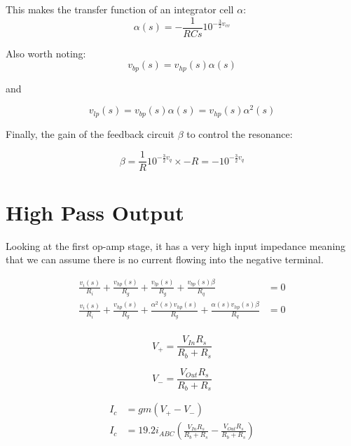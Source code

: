 \documentclass{article}
\begin{document}
This makes the transfer function of an integrator cell $\alpha$:
\begin{equation}
  \alpha(s) = - \frac{1}{RCs}10^{-{\frac{3}{2}}v_{cv}}
\end{equation}

Also worth noting:
\begin{equation}
  v_{bp} (s) = v_{hp} (s)\alpha(s)
\end{equation}

and

\begin{equation}
  v_{lp} (s) = v_{bp} (s)\alpha(s) = v_{hp}(s)\alpha^2(s)
\end{equation}

Finally, the gain of the feedback circuit $\beta$ to control the resonance:

\begin{equation}
  \beta = \frac{1}{R}10^{-{\frac{3}{2}}v_{q}} \times -R = -10^{-{\frac{3}{2}}v_{q}}
\end{equation}

\section{High Pass Output}

Looking at the first op-amp stage, it has a very high input impedance meaning that we can assume there is no current flowing into the negative terminal.

\begin{equation*}
\begin{split}
  \frac{v_i(s)}{R_i} + \frac{v_{hp}(s)}{R_g} + \frac{v_{lp}(s)}{R_g} + \frac{v_{bp}(s)\beta}{R_q} & = 0 \\
  \frac{v_i(s)}{R_i} + \frac{v_{hp}(s)}{R_g} + \frac{{\alpha}^2(s)v_{hp}(s)}{R_g} + \frac{{\alpha}(s)v_{hp}(s)\beta}{R_q} & = 0 \\
\end{split}
\end{equation*}


\begin{equation}
  V_{+} = \frac{V_{In}R_{s}}{R_{b} + R_{s}}
\end{equation}

\begin{equation}
  V_{-} = \frac{V_{Out}R_{s}}{R_{b} + R_{s}}
\end{equation}

\begin{equation*}
\begin{split}
  I_{c} & = {gm}(V_{+} - V_{-}) \\
  I_{c} & = {19.2}i_{ABC}(\frac{V_{In}R_{s}}{R_{b} + R_{s}} - \frac{V_{Out}R_{s}}{R_{b} + R_{s}}) \\
\end{split}
\end{equation*}
\end{document}
